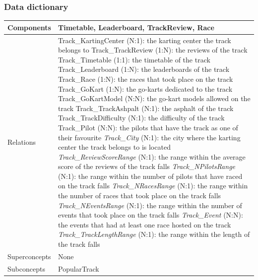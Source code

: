 \documentclass{beamer}
\begin{document}
\begin{frame}
\frametitle{Data dictionary}
\begin{table}
\tiny
\begin{tabular}{|p{2cm}|p{6cm}|}
\hline
Components & 
Timetable, Leaderboard, TrackReview, Race \\
\hline
Relations &
Track\_KartingCenter (N:1): the karting center the track belongs to \newline
Track\_TrackReview (1:N): the reviews of the track \newline
Track\_Timetable (1:1): the timetable of the track \newline
Track\_Leaderboard (1:N): the leaderboards of the track \newline
Track\_Race (1:N): the races that took place on the track \newline
Track\_GoKart (1:N): the go-karts dedicated to the track \newline
Track\_GoKartModel (N:N): the go-kart models allowed on the track \newline
Track\_TrackAshpalt (N:1): the asphalt of the track \newline
Track\_TrackDifficulty (N:1): the difficulty of the track \newline
Track\_Pilot (N:N): the pilots that have the track as one of their favourite \newline
\textit{Track\_City} (N:1): the city where the karting center the track belongs to is located \newline
\textit{Track\_ReviewScoreRange} (N:1): the range within the average score of the reviews of the track falls \newline
\textit{Track\_NPilotsRange} (N:1): the range within the number of pilots that have raced on the track falls \newline
\textit{Track\_NRacesRange} (N:1): the range within the number of races that took place on the track falls \newline
\textit{Track\_NEventsRange} (N:1): the range within the number of events that took place on the track falls \newline
\textit{Track\_Event} (N:N): the events that had at least one race hosted on the track \newline
\textit{Track\_TrackLengthRange} (N:1): the range within the length of the track falls \\
\hline
Superconcepts & None \\
\hline
Subconcepts & 
PopularTrack \\
\hline
\end{tabular}
\end{table}
\end{frame}
\end{document}
